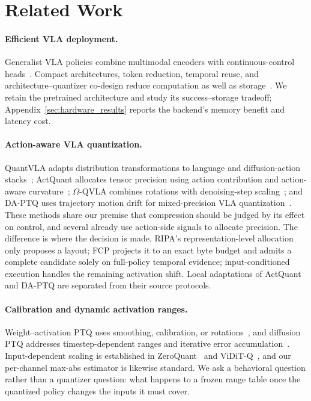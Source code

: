 \section{Related Work}
\label{sec:related}

\paragraph{Efficient VLA deployment.}
Generalist VLA policies combine multimodal encoders with continuous-control heads~\citep{brohan2023rt2,octo2024,kim2024openvla,black2024pi0,intelligence2025pi05,bjorck2025groot}. Compact architectures, token reduction, temporal reuse, and architecture--quantizer co-design reduce computation as well as storage~\citep{shukor2025smolvla,zhang2025molevla,yang2025efficientvla,xu2025vlacache,fang2025sqapvla}. We retain the pretrained architecture and study its success--storage tradeoff; Appendix~\ref{sec:hardware_results} reports the backend's memory benefit and latency cost.

\paragraph{Action-aware VLA quantization.}
QuantVLA adapts distribution transformations to language and diffusion-action stacks~\citep{zhang2026quantvla}; ActQuant allocates tensor precision using action contribution and action-aware curvature~\citep{akbari2026actquant}; $\Omega$-QVLA combines rotations with denoising-step scaling~\citep{wang2026omegaqvla}; and DA-PTQ uses trajectory motion drift for mixed-precision VLA quantization~\citep{xu2026daptq}. These methods share our premise that compression should be judged by its effect on control, and several already use action-side signals to allocate precision. The difference is where the decision is made. RIPA's representation-level allocation only proposes a layout; FCP projects it to an exact byte budget and admits a complete candidate solely on full-policy temporal evidence; input-conditioned execution handles the remaining activation shift. Local adaptations of ActQuant and DA-PTQ are separated from their source protocols.

\paragraph{Calibration and dynamic activation ranges.}
Weight--activation PTQ uses smoothing, calibration, or rotations~\citep{xiao2023smoothquant,shao2024omniquant,ashkboos2024quarot,lin2024duquant,liu2025spinquant,sun2025flatquant}, and diffusion PTQ addresses timestep-dependent ranges and iterative error accumulation~\citep{shang2023ptq4dm,li2023qdiffusion,wu2024ptq4dit,chen2024qdit,zhao2024mixdq}. Input-dependent scaling is established in ZeroQuant~\citep{yao2022zeroquant} and ViDiT-Q~\citep{zhao2024viditq}, and our per-channel max-abs estimator is likewise standard. We ask a behavioral question rather than a quantizer question: what happens to a frozen range table once the quantized policy changes the inputs it must cover.

